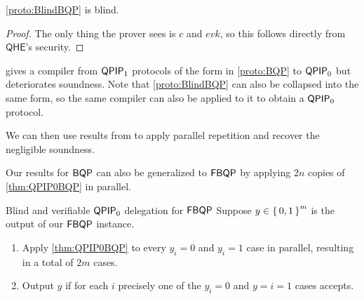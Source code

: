 \begin{thm}
	\cref{proto:BlindBQP} is blind.
\end{thm}
\begin{proof}
	The only thing the prover sees is $c$ and $evk$, so this follows directly from $\mathsf{QHE}$'s security.
\end{proof}

\cite{mahadev_delegation} gives a compiler from $\operatorname{\mathsf{QPIP}}_1$ protocols of the form in \cref{proto:BQP} to $\operatorname{\mathsf{QPIP}}_0$ but deteriorates soundness.
Note that \cref{proto:BlindBQP} can also be collapsed into the same form, so the same compiler can also be applied to it to obtain a $\operatorname{\mathsf{QPIP}}_0$ protocol.

We can then use results from \cite{parallelrep} to apply parallel repetition and recover the negligible soundness.

Our results for $\operatorname{\mathsf{BQP}}$ can also be generalized to $\operatorname{\mathsf{FBQP}}$ by applying $2n$ copies of \cref{thm:QPIP0BQP} in parallel.

\begin{protocol}{Blind and verifiable $\operatorname{\mathsf{QPIP}}_0$ delegation for $\operatorname{\mathsf{FBQP}}$}
	\label{QPIP0FBQP}
	Suppose $y\in\set{0,1}^m$ is the output of our $\operatorname{\mathsf{FBQP}}$ instance.
	\begin{enumerate}
		\item Apply \cref{thm:QPIP0BQP} to every $y_i=0$ and $y_i=1$ case in parallel, resulting in a total of $2m$ cases.
		\item Output $y$ if for each $i$ precisely one of the $y_i=0$ and $y=i=1$ cases accepts.
	\end{enumerate}
\end{protocol}

